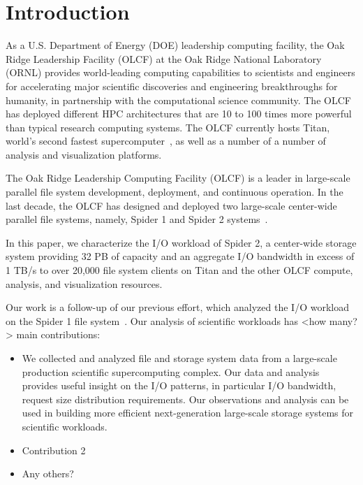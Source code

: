 \section{Introduction}
\label{sec:intro}

As a U.S. Department of Energy (DOE) leadership computing facility, the Oak
Ridge Leadership Facility (OLCF) at the Oak Ridge National Laboratory (ORNL)
provides world-leading computing capabilities to scientists and engineers for
accelerating major scientific discoveries and engineering breakthroughs for
humanity, in partnership with the computational science community. The OLCF has
deployed different HPC architectures that are 10 to 100 times more powerful
than typical research computing systems. The OLCF currently hosts Titan,
world's second fastest supercomputer~\cite{titan}, as well as a number of a
number of analysis and visualization platforms.


The Oak Ridge Leadership Computing Facility (OLCF) is a leader in large-scale
parallel file system development, deployment, and continuous operation. In the
last decade, the OLCF has designed and deployed two large-scale center-wide
parallel file systems, namely, Spider 1 and Spider 2 systems~\cite{spider1,
spider2}. 

In this paper, we characterize the I/O workload of Spider 2, a center-wide 
storage system providing 32 PB of capacity and an aggregate I/O 
bandwidth in excess of 1 TB/s to over 20,000 file system clients on Titan and the
other OLCF compute, analysis, and visualization resources. 

Our work is a follow-up of our previous effort, which analyzed the I/O workload
on the Spider 1 file system~\cite{spider1-workload}.  Our analysis of
scientific workloads has <how many?> main contributions: 

\begin{itemize}


\item We collected and analyzed file and storage system data from a large-scale
production scientific supercomputing complex. Our data and analysis provides
useful insight on the I/O patterns, in particular I/O bandwidth, request size
distribution requirements. Our observations and analysis can be used in
building more efficient next-generation large-scale storage systems for
scientific workloads.  

\item Contribution 2

\item Any others? 

\end{itemize}
